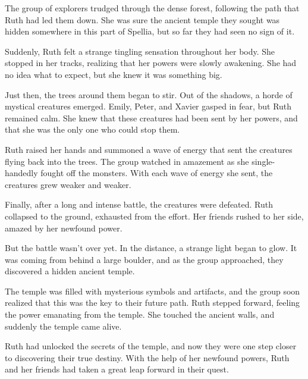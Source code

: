The group of explorers trudged through the dense forest, following the path that Ruth had led them down. She was sure the ancient temple they sought was hidden somewhere in this part of Spellia, but so far they had seen no sign of it.

Suddenly, Ruth felt a strange tingling sensation throughout her body. She stopped in her tracks, realizing that her powers were slowly awakening. She had no idea what to expect, but she knew it was something big.

Just then, the trees around them began to stir. Out of the shadows, a horde of mystical creatures emerged. Emily, Peter, and Xavier gasped in fear, but Ruth remained calm. She knew that these creatures had been sent by her powers, and that she was the only one who could stop them.

Ruth raised her hands and summoned a wave of energy that sent the creatures flying back into the trees. The group watched in amazement as she single-handedly fought off the monsters. With each wave of energy she sent, the creatures grew weaker and weaker.

Finally, after a long and intense battle, the creatures were defeated. Ruth collapsed to the ground, exhausted from the effort. Her friends rushed to her side, amazed by her newfound power.

But the battle wasn't over yet. In the distance, a strange light began to glow. It was coming from behind a large boulder, and as the group approached, they discovered a hidden ancient temple.

The temple was filled with mysterious symbols and artifacts, and the group soon realized that this was the key to their future path. Ruth stepped forward, feeling the power emanating from the temple. She touched the ancient walls, and suddenly the temple came alive.

Ruth had unlocked the secrets of the temple, and now they were one step closer to discovering their true destiny. With the help of her newfound powers, Ruth and her friends had taken a great leap forward in their quest.